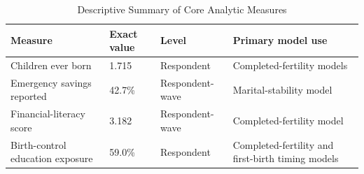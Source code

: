 \begin{table}

\caption{Descriptive Summary of Core Analytic Measures}
\centering
\begin{tabular}[t]{llll}
\toprule
Measure & Exact value & Level & Primary model use\\
\midrule
Children ever born & 1.715 & Respondent & Completed-fertility models\\
Emergency savings reported & 42.7\% & Respondent-wave & Marital-stability model\\
Financial-literacy score & 3.182 & Respondent-wave & Completed-fertility model\\
Birth-control education exposure & 59.0\% & Respondent & Completed-fertility and first-birth timing models\\
\bottomrule
\end{tabular}
\end{table}
